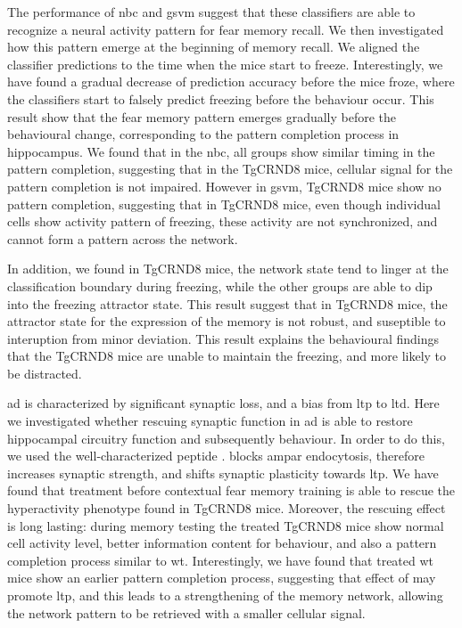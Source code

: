 The performance of \gls{nbc} and \gls{gsvm} suggest that these classifiers are able to recognize a neural activity pattern for fear memory recall. We then investigated how this pattern emerge at the beginning of memory recall. We aligned the classifier predictions to the time when the mice start to freeze. Interestingly, we have found a gradual decrease of prediction accuracy before the mice froze, where the classifiers start to falsely predict freezing before the behaviour occur. This result show that the fear memory pattern emerges gradually before the behavioural change, corresponding to the pattern completion process in hippocampus. We found that in the \gls{nbc}, all groups show similar timing in the pattern completion, suggesting that in the TgCRND8 mice, cellular signal for the pattern completion is not impaired. However in \gls{gsvm}, TgCRND8 mice show no pattern completion, suggesting that in TgCRND8 mice, even though individual cells show activity pattern of freezing, these activity are not synchronized, and cannot form a pattern across the network. 

In addition, we found in TgCRND8 mice, the network state tend to linger at the classification boundary during freezing, while the other groups are able to dip into the freezing attractor state. This result suggest that in TgCRND8 mice, the attractor state for the expression of the memory is not robust, and suseptible to interuption from minor deviation. This result explains the behavioural findings that the TgCRND8 mice are unable to maintain the freezing, and more likely to be distracted. 

\Gls{ad} is characterized by significant synaptic loss, and a bias from \gls{ltp} to \gls{ltd}. Here we investigated whether rescuing synaptic function in \gls{ad} is able to restore hippocampal circuitry function and subsequently behaviour. In order to do this, we used the well-characterized peptide \tglu. \tglu blocks \gls{ampar} endocytosis, therefore increases synaptic strength, and shifts synaptic plasticity towards \gls{ltp}. We have found that \tglu treatment before contextual fear memory training is able to rescue the hyperactivity phenotype found in TgCRND8 mice. Moreover, the rescuing effect is long lasting: during memory testing the treated TgCRND8 mice show normal cell activity level, better information content for behaviour, and also a pattern completion process similar to \gls{wt}. Interestingly, we have found that \tglu treated \gls{wt} mice show an earlier pattern completion process, suggesting that effect of \tglu may promote \gls{ltp}, and this leads to a strengthening of the memory network, allowing the network pattern to be retrieved with a smaller cellular signal. 

